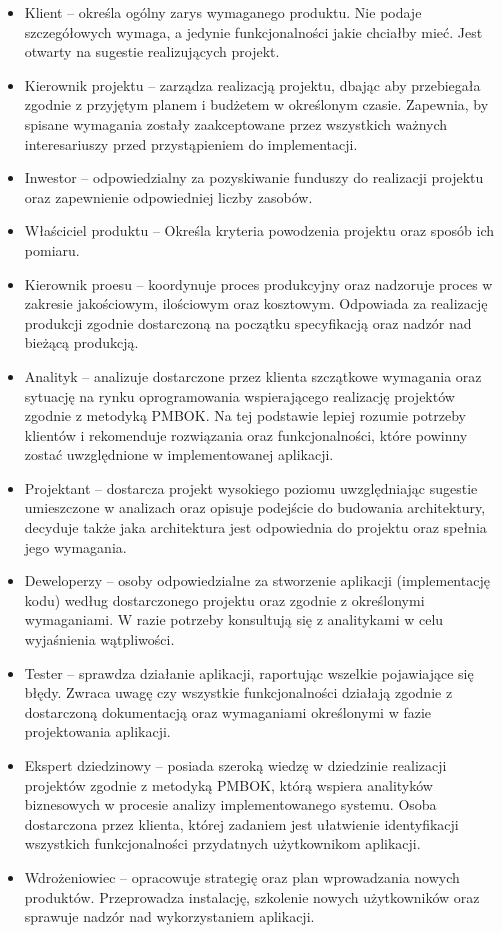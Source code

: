 \begin{itemize}
\item Klient – określa ogólny zarys wymaganego produktu. Nie podaje szczegółowych wymaga, a jedynie funkcjonalności jakie chciałby mieć. Jest otwarty na sugestie realizujących projekt.
\item Kierownik projektu – zarządza realizacją projektu, dbając aby przebiegała zgodnie z przyjętym planem i budżetem w określonym czasie. Zapewnia, by spisane wymagania zostały zaakceptowane przez wszystkich ważnych interesariuszy przed przystąpieniem do implementacji.
\item Inwestor – odpowiedzialny za pozyskiwanie funduszy do realizacji projektu oraz zapewnienie odpowiedniej liczby zasobów.
\item Właściciel produktu – Określa kryteria powodzenia projektu oraz sposób ich pomiaru.
\item Kierownik proesu – koordynuje proces produkcyjny oraz nadzoruje proces w zakresie jakościowym, ilościowym oraz kosztowym. Odpowiada za realizację produkcji zgodnie dostarczoną na początku specyfikacją oraz nadzór nad bieżącą produkcją.
\item Analityk – analizuje dostarczone przez klienta szczątkowe wymagania oraz sytuację na rynku oprogramowania wspierającego realizację projektów zgodnie z metodyką PMBOK. Na tej podstawie lepiej rozumie potrzeby klientów i rekomenduje rozwiązania oraz funkcjonalności, które powinny zostać uwzględnione w implementowanej aplikacji.
\item Projektant – dostarcza projekt wysokiego poziomu uwzględniając sugestie umieszczone w analizach oraz opisuje podejście do budowania architektury, decyduje także jaka architektura jest odpowiednia do projektu oraz spełnia jego wymagania.
\item Deweloperzy – osoby odpowiedzialne za stworzenie aplikacji (implementację kodu) według dostarczonego projektu oraz zgodnie z określonymi wymaganiami. W razie potrzeby konsultują się z analitykami w celu wyjaśnienia wątpliwości.
\item Tester – sprawdza działanie aplikacji, raportując wszelkie pojawiające się błędy. Zwraca uwagę czy wszystkie funkcjonalności działają zgodnie z dostarczoną dokumentacją oraz wymaganiami określonymi w fazie projektowania aplikacji.
\item Ekspert dziedzinowy – posiada szeroką wiedzę w dziedzinie realizacji projektów zgodnie z metodyką PMBOK, którą wspiera analityków biznesowych w procesie analizy implementowanego systemu. Osoba dostarczona przez klienta, której zadaniem jest ułatwienie identyfikacji wszystkich funkcjonalności przydatnych użytkownikom aplikacji.
\item Wdrożeniowiec – opracowuje strategię oraz plan wprowadzania nowych produktów. Przeprowadza instalację, szkolenie nowych użytkowników oraz sprawuje nadzór nad wykorzystaniem aplikacji.
\end{itemize}

